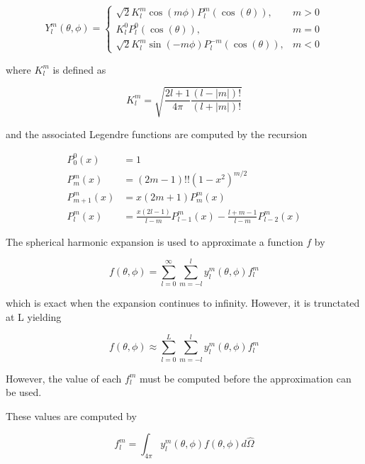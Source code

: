 \documentclass{article}
\numberwithin{equation}{subsection}
\begin{document}
\begin{equation}
    Y_l^m(\theta, \phi)= 
\begin{cases}
\sqrt{2} K_l^m \cos(m \phi) P_l^m(\cos(\theta)),      & m > 0 \\
K_l^0 P_l^0(\cos(\theta)),              & m = 0  \\
\sqrt{2} K_l^m \sin(-m \phi) P_l^{-m}(\cos(\theta)),           & m < 0
\end{cases}
\end{equation}

where $K_l^m$ is defined as

\begin{equation}
K_l^m = \sqrt{\frac{2l+1}{4 \pi} \frac{(l-|m|)!}{(l+|m|)!}}
\end{equation}

and the associated Legendre functions are computed by the recursion

\begin{equation}
\begin{aligned}
P_0^0(x) &= 1 \\
P_m^m(x) &= (2m-1)!!(1-x^2)^{m/2} \\
P_{m+1}^m(x) &= x(2m+1)P_m^m(x) \\
P_l^m(x) &= \frac{x(2l-1)}{l-m} P_{l-1}^m (x) - \frac{l+m-1}{l-m} P_{l-2}^m (x)
\end{aligned}
\end{equation}

The spherical harmonic expansion is used to approximate a function $f$ by 

\begin{equation}
f(\theta, \phi) = \sum_{l=0}^\infty \sum_{m=-l}^l y_l^m(\theta, \phi) f_l^m
\end{equation}

which is exact when the expansion continues to infinity. However, it is trunctated at L yielding

\begin{equation}
f(\theta, \phi) \approx \sum_{l=0}^L \sum_{m=-l}^l y_l^m(\theta, \phi) f_l^m
\end{equation}

However, the value of each $f_l^m$ must be computed before the approximation can be used.

These values are computed by

\begin{equation}\label{eq:flm}
f_l^m = \int_{4 \pi} y_l^m(\theta, \phi) f(\theta, \phi) d\hat{\Omega}
\end{equation}
\end{document}
